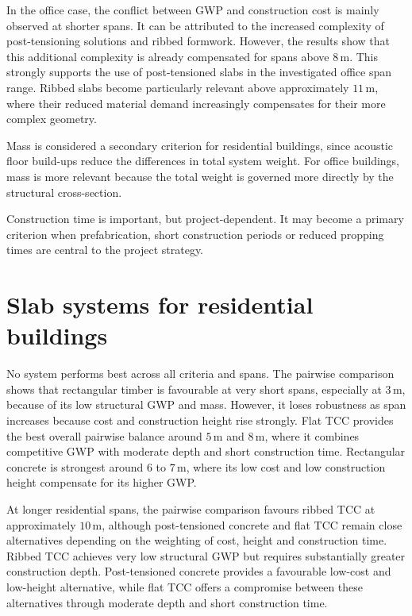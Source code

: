In the office case, the conflict between GWP and construction cost is mainly observed at shorter spans. It can be attributed to the increased complexity of post-tensioning solutions and ribbed formwork. However, the results show that this additional complexity is already compensated for spans above \(8\,\mathrm{m}\). This strongly supports the use of post-tensioned slabs in the investigated office span range. Ribbed slabs become particularly relevant above approximately \(11\,\mathrm{m}\), where their reduced material demand increasingly compensates for their more complex geometry.

Mass is considered a secondary criterion for residential buildings, since acoustic floor build-ups reduce the differences in total system weight. For office buildings, mass is more relevant because the total weight is governed more directly by the structural cross-section.

Construction time is important, but project-dependent. It may become a primary criterion when prefabrication, short construction periods or reduced propping times are central to the project strategy.

\newpage
\section{Slab systems for residential buildings}
No system performs best across all criteria and spans. The pairwise comparison shows that rectangular timber is favourable at very short spans, especially at \(3\,\mathrm{m}\), because of its low structural GWP and mass. However, it loses robustness as span increases because cost and construction height rise strongly. Flat TCC provides the best overall pairwise balance around \(5\,\mathrm{m}\) and \(8\,\mathrm{m}\), where it combines competitive GWP with moderate depth and short construction time. Rectangular concrete is strongest around \(6\) to \(7\,\mathrm{m}\), where its low cost and low construction height compensate for its higher GWP.

At longer residential spans, the pairwise comparison favours ribbed TCC at approximately \(10\,\mathrm{m}\), although post-tensioned concrete and flat TCC remain close alternatives depending on the weighting of cost, height and construction time. Ribbed TCC achieves very low structural GWP but requires substantially greater construction depth. Post-tensioned concrete provides a favourable low-cost and low-height alternative, while flat TCC offers a compromise between these alternatives through moderate depth and short construction time.

